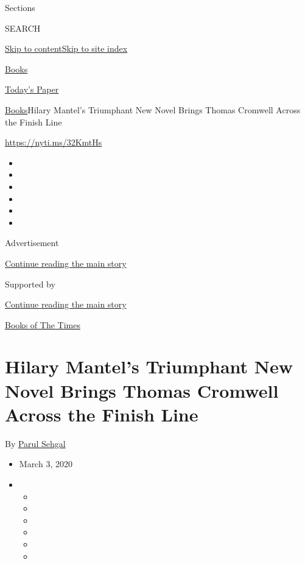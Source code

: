 Sections

SEARCH

\protect\hyperlink{site-content}{Skip to
content}\protect\hyperlink{site-index}{Skip to site index}

\href{https://www.nytimes.com/section/books}{Books}

\href{https://myaccount.nytimes.com/auth/login?response_type=cookie\&client_id=vi}{}

\href{https://www.nytimes.com/section/todayspaper}{Today's Paper}

\href{/section/books}{Books}\textbar{}Hilary Mantel's Triumphant New
Novel Brings Thomas Cromwell Across the Finish Line

\url{https://nyti.ms/32KmtHs}

\begin{itemize}
\item
\item
\item
\item
\item
\item
\end{itemize}

Advertisement

\protect\hyperlink{after-top}{Continue reading the main story}

Supported by

\protect\hyperlink{after-sponsor}{Continue reading the main story}

\href{/column/books-of-the-times}{Books of The Times}

\hypertarget{hilary-mantels-triumphant-new-novel-brings-thomas-cromwell-across-the-finish-line}{%
\section{Hilary Mantel's Triumphant New Novel Brings Thomas Cromwell
Across the Finish
Line}\label{hilary-mantels-triumphant-new-novel-brings-thomas-cromwell-across-the-finish-line}}

By \href{https://www.nytimes.com/by/parul-sehgal}{Parul Sehgal}

\begin{itemize}
\item
  March 3, 2020
\item
  \begin{itemize}
  \item
  \item
  \item
  \item
  \item
  \item
  \end{itemize}
\end{itemize}

